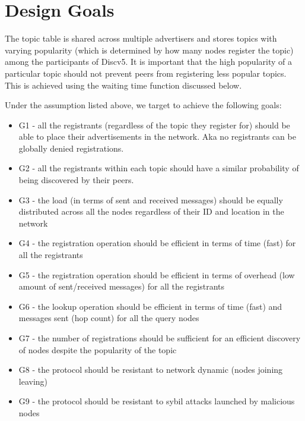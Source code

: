 
\section{Design Goals}\label{sec:goals}


The topic table is shared across multiple advertisers and stores topics with varying popularity (which is determined by how many nodes register the topic) among the participants of Discv5. It is important that the high popularity of a particular topic should not prevent peers from registering less popular topics. This is achieved using the waiting time function discussed below.



Under the assumption listed above, we target to achieve the following goals:
\begin{itemize}
    \item G1 - all the registrants (regardless of the topic they register for) should be able to place their advertisements in the network. Aka no registrants can be globally denied registrations.
    \item G2 - all the registrants within each topic should have a similar probability of being discovered by their peers.
    \item G3 - the load (in terms of sent and received messages) should be equally distributed across all the nodes regardless of their ID and location in the network
    \item G4 - the registration operation should be efficient in terms of time (fast) for all the registrants
    \item G5 - the registration operation should be efficient in terms of overhead (low amount of sent/received messages) for all the registrants
    \item G6 - the lookup operation should be efficient in terms of time (fast) and messages sent (hop count) for all the query nodes
    \item G7 - the number of registrations should be sufficient for an efficient discovery of nodes despite the popularity of the topic
    \item G8 - the protocol should be resistant to network dynamic (nodes joining leaving)
    \item G9 - the protocol should be resistant to sybil attacks launched by malicious nodes
\end{itemize}
